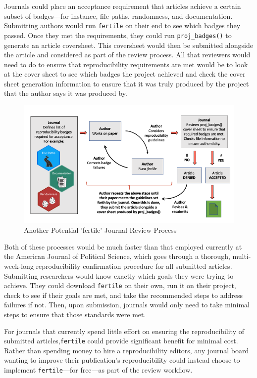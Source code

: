 \documentclass[12pt,twoside]{reedthesis}
\begin{document}
Journals could place an acceptance requirement that articles achieve a certain subset of badges---for instance, file paths, randomness, and documentation. Submitting authors would run \texttt{fertile} on their end to see which badges they passed. Once they met the requirements, they could run \texttt{proj\_badges()} to generate an article coversheet. This coversheet would then be submitted alongside the article and considered as part of the review process. All that reviewers would need to do to ensure that reproducibility requirements are met would be to look at the cover sheet to see which badges the project achieved and check the cover sheet generation information to ensure that it was truly produced by the project that the author says it was produced by.
\begin{figure}
\includegraphics[width=1\linewidth]{figure/journal-process-2} \caption{Another Potential 'fertile' Journal Review Process}\label{fig:unnamed-chunk-44}
\end{figure}
Both of these processes would be much faster than that employed currently at the American Journal of Political Science, which goes through a thorough, multi-week-long reproducibility confirmation procedure for all submitted articles. Submitting researchers would know exactly which goals they were trying to achieve. They could download \texttt{fertile} on their own, run it on their project, check to see if their goals are met, and take the recommended steps to address failures if not. Then, upon submission, journals would only need to take minimal steps to ensure that those standards were met.

For journals that currently spend little effort on ensuring the reproducibility of submitted articles,\texttt{fertile} could provide significant benefit for minimal cost. Rather than spending money to hire a reproducibility editors, any journal board wanting to improve their publication's reproducibility could instead choose to implement \texttt{fertile}---for free---as part of the review workflow.
\end{document}
